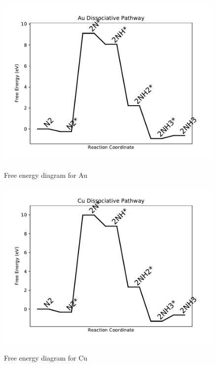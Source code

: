 \documentclass[journal=jacsat,manuscript=article]{achemso}
\begin{document}
\begin{figure}
\includegraphics[width=1\linewidth]{data/plots/Au_dissociative.pdf}
\label{fig:Au_dissociative}
\caption{Free energy diagram for Au}
\end{figure}

\newpage
\begin{figure}
\includegraphics[width=1\linewidth]{data/plots/Cu_dissociative.pdf}
\label{fig:Cu_dissociative}
\caption{Free energy diagram for Cu}
\end{figure}
\end{document}
